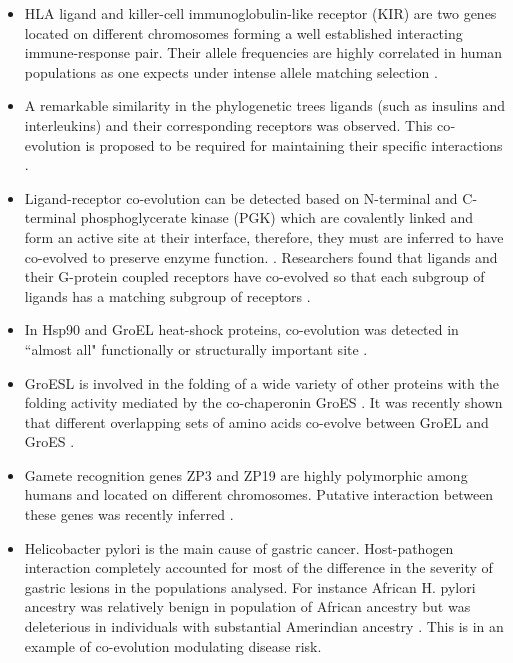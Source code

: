 \begin{itemize}

\item HLA ligand and killer-cell immunoglobulin-like receptor (KIR) are two genes located on different chromosomes forming a well established interacting immune-response pair.
Their allele frequencies are highly correlated in human populations as one expects under intense allele matching selection \cite{single2007global}.

\item A remarkable similarity in the phylogenetic trees ligands (such as insulins and interleukins) and their corresponding receptors was observed.
This co‐evolution is proposed to be required for maintaining their specific interactions \cite{pazos2001similarity}.

\item Ligand-receptor co-evolution can be detected based on N-terminal and C-terminal phosphoglycerate kinase (PGK) which are covalently linked and form an active site at their interface, therefore, they must are inferred to have co-evolved to preserve enzyme function. \cite{goh2000co}.
Researchers found that ligands and their G-protein coupled receptors have co-evolved so that each subgroup of ligands has a matching subgroup of receptors \cite{goh2000co}.

\item In Hsp90 and GroEL heat-shock proteins, co-evolution was detected in ``almost all" functionally or structurally important site \cite{fares2006novel}.

\item GroESL is involved in the folding of a wide variety of other proteins with the folding activity mediated by the co-chaperonin GroES  \cite{ruiz2013coevolution}.
It was recently shown that different overlapping sets of amino acids co-evolve between GroEL and GroES \cite{ruiz2013coevolution}.

\item Gamete recognition genes ZP3 and ZP19 are highly polymorphic among humans and located on different chromosomes.
Putative interaction between these genes was recently inferred \cite{rohlfs2010detecting}.

\item Helicobacter pylori is the main cause of gastric cancer. 
Host-pathogen interaction completely accounted for most of the difference in the severity of gastric lesions in the populations analysed. 
For instance African H. pylori ancestry was relatively benign in population of African ancestry but was deleterious in individuals with substantial Amerindian ancestry \cite{kodaman2014human}.
This is in an example of co-evolution modulating disease risk.

\end{itemize}


